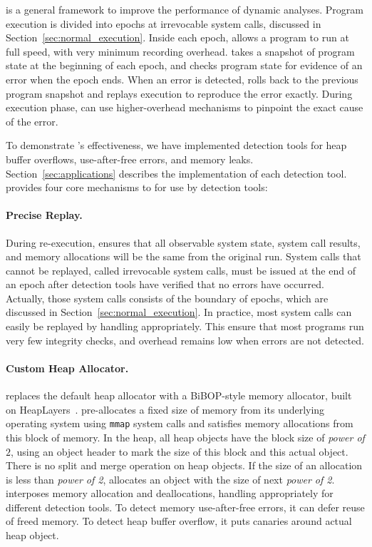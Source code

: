 \label{sec:overview}

\doubletake{} is a general framework to improve the performance of dynamic analyses. Program execution is divided into epochs at irrevocable system calls, discussed in Section~\ref{sec:normal_execution}. Inside each epoch, \doubletake{} allows a program to run at full speed, with very minimum recording overhead. \doubletake{} takes a snapshot of program state at the beginning of each epoch, and checks program state for evidence of an error when the epoch ends. When an error is detected, \doubletake{} rolls back to the previous program snapshot and replays execution to reproduce the error exactly. During execution phase, \doubletake{} can use higher-overhead mechanisms to pinpoint the exact cause of the error.


To demonstrate \doubletake{}'s effectiveness, we have implemented detection tools for heap buffer overflows, use-after-free errors, and memory leaks. Section~\ref{sec:applications} describes the implementation of each detection tool. \doubletake{} provides four core mechanisms to for use by detection tools:

\paragraph{Precise Replay.}
During re-execution, \doubletake{} ensures that all observable system state, system call results, and memory allocations will be the same from the original run. System calls that cannot be replayed, called irrevocable system calls, must be issued at the end of an epoch after detection tools have verified that no errors have occurred. Actually, those system calls consists of the boundary of epochs, which are discussed in Section~\ref{sec:normal_execution}. In practice, most system calls can easily be replayed by handling appropriately. This ensure that most programs run very few integrity checks, and overhead remains low when errors are not detected.

\paragraph{Custom Heap Allocator.}
\doubletake{} replaces the default heap allocator with a BiBOP-style memory allocator, built on HeapLayers~\cite{heaplayers}. \DoubleTake{} pre-allocates a fixed size of memory from its underlying operating system using \texttt{mmap} system calls and satisfies memory allocations from this block of memory. In the heap, all heap objects have the block size of {\it power of $2$}, using an object header to mark the size of this block and this actual object. There is no split and merge operation on heap objects. If the size of an allocation is less than {\it power of 2}, \DoubleTake{} allocates an object with the size of next {\it power of 2}. \doubletake{} interposes memory allocation and deallocations, handling appropriately for different detection tools. To detect memory use-after-free errors, it can defer reuse of freed memory. To detect heap buffer overflow, it puts canaries around actual heap object. 

